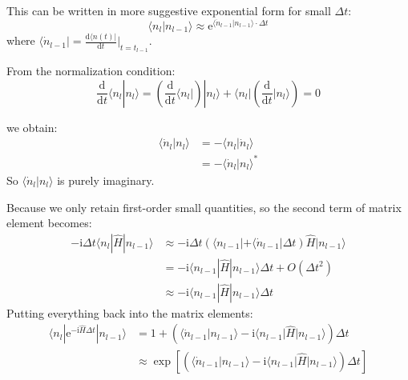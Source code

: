 This can be written in more suggestive exponential form for small $\Delta t$:
\begin{equation}
\langle n_l | n_{l-1}\rangle \approx \mathrm{e}^{\langle \dot{n}_{l-1} | n_{l-1}\rangle \cdot \Delta t}
\end{equation}
where $\langle \dot{n}_{l-1}| = \frac{\mathrm{d}\langle n(t)|}{\mathrm{d}t}\Big|_{t=t_{l-1}}$.

From the normalization condition:
\begin{equation}
\frac{\mathrm{d}}{\mathrm{d}t}\langle n_l | n_l\rangle = \left( \frac{\mathrm{d}}{\mathrm{d}t}\langle n_l| \right) |n_l\rangle + \langle n_l | \left( \frac{\mathrm{d}}{\mathrm{d}t}|n_l\rangle \right) = 0
\end{equation}

we obtain:
\begin{equation}
\begin{aligned}
\langle \dot{n}_l | n_l\rangle &= - \langle n_l | \dot{n}_l\rangle \\
&= - \langle \dot{n}_l | n_l\rangle^*
\end{aligned}
\end{equation}
So $\langle \dot{n}_l | n_l\rangle$ is purely imaginary.

Because we only retain first-order small quantities, so the
second term of matrix element becomes:
\begin{equation}
\begin{aligned}
-\mathrm{i}\Delta t \langle n_l | \hat{H} | n_{l-1}\rangle &\approx -\mathrm{i}\Delta t (\langle n_{l-1}| + \langle \dot{n}_{l-1}|\Delta t) \hat{H} |n_{l-1}\rangle \\
&= -\mathrm{i} \langle n_{l-1} | \hat{H} | n_{l-1}\rangle \Delta t + O(\Delta t^2) \\
&\approx -\mathrm{i} \langle n_{l-1} | \hat{H} | n_{l-1}\rangle \Delta t
\end{aligned}
\end{equation}
Putting everything back into the matrix elements:
\begin{equation}
\begin{aligned}
\langle n_l | \mathrm{e}^{-\mathrm{i}\hat{H}\Delta t} | n_{l-1}\rangle &= 1 + (\langle \dot{n}_{l-1} | n_{l-1}\rangle - \mathrm{i} \langle n_{l-1} | \hat{H} | n_{l-1}\rangle) \Delta t \\
&\approx \exp \left[ (\langle \dot{n}_{l-1} | n_{l-1}\rangle - \mathrm{i} \langle n_{l-1} | \hat{H} | n_{l-1}\rangle) \Delta t \right]
\end{aligned}
\end{equation}


